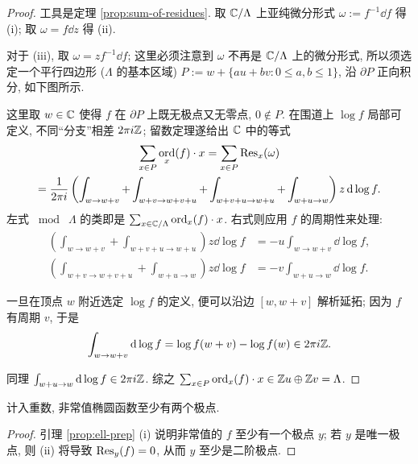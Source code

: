 \begin{proof}
	工具是定理 \ref{prop:sum-of-residues}. 取 $\mathbb{C}/\Lambda$ 上亚纯微分形式 $\omega := f^{-1}\dd f$ 得 (i); 取 $\omega = f \dd z$ 得 (ii).
	
	对于 (iii), 取 $\omega = z f^{-1} \dd f$; 这里必须注意到 $\omega$ 不再是 $\mathbb{C}/\Lambda$ 上的微分形式, 所以须选定一个平行四边形 ($\Lambda$ 的基本区域) $P := w + \{au + bv: 0 \leq a,b \leq 1 \}$, 沿 $\partial P$ 正向积分, 如下图所示.
	\begin{center}\end{center}
	这里取 $w \in \mathbb{C}$ 使得 $f$ 在 $\partial P$ 上既无极点又无零点, $0 \notin P$. 在围道上 $\log f$ 局部可定义, 不同``分支''相差 $2\pi i\mathbb{Z}$; 留数定理遂给出 $\mathbb{C}$ 中的等式
	\begin{multline*}
		\sum_{x \in P} \operatorname*{ord}_x(f) \cdot x = \sum_{x \in P} \operatorname{Res}_x (\omega) \\
		= \frac{1}{2\pi i} \left( \int_{w \to w + v} + \int_{w+v \to w+v+u} + \int_{w+v+u \to w+u} + \int_{w+u \to w} \right) z \mathop{}\!\mathrm{d} \log f.
	\end{multline*}
	左式 $\bmod\; \Lambda$ 的类即是 $\sum_{x \in \mathbb{C}/\Lambda} \operatorname*{ord}_x(f) \cdot x$. 右式则应用 $f$ 的周期性来处理:
	\begin{align*}
		\left( \int_{w \to w+v} + \int_{w+v+u \to w+u} \right) z \dd \log f & = -u \int_{w \to w+v} \dd\log f, \\
		\left( \int_{w+v \to w+v+u} + \int_{w+u \to w} \right) z \dd \log f & = -v \int_{w+u \to w} \dd\log f.
	\end{align*}

	一旦在顶点 $w$ 附近选定 $\log f$ 的定义, 便可以沿边 $[w, w+v]$ 解析延拓; 因为 $f$ 有周期 $v$, 于是
	\[ \int_{w \to w+v} \mathop{}\!\mathrm{d} \log f = \log f(w+v) - \log f(w) \in 2\pi i \mathbb{Z}. \]
	
	同理 $\int_{w+u \to w} \mathop{}\!\mathrm{d} \log f \in 2\pi i\mathbb{Z}$. 综之 $\sum_{x \in P} \operatorname*{ord}_x(f) \cdot x \in \mathbb{Z} u \oplus \mathbb{Z} v = \Lambda$.
\end{proof}

\begin{proposition}\label{prop:elliptic-pole}
	计入重数, 非常值椭圆函数至少有两个极点.
\end{proposition}
\begin{proof}
	引理 \ref{prop:ell-prep} (i) 说明非常值的 $f$ 至少有一个极点 $y$; 若 $y$ 是唯一极点, 则 (ii) 将导致 $\operatorname{Res}_y(f) = 0$, 从而 $y$ 至少是二阶极点.
\end{proof}

